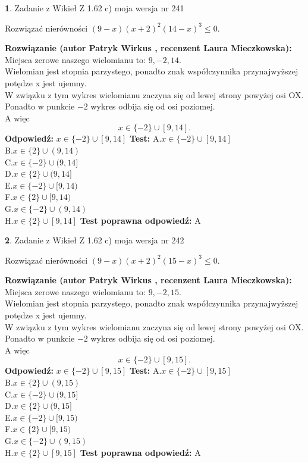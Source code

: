 \documentclass[12pt, a4paper]{article}
\theoremstyle{definition} %
\newtheorem{zad}{}
\newcommand{\zadStart}[1]{\begin{zad}#1\newline}
\newcommand{\zadStop}{\end{zad}}
\newcommand{\rozwStart}[2]{\noindent \textbf{Rozwiązanie (autor #1 , recenzent #2): }\newline}
\newcommand{\rozwStop}{\newline}
\newcommand{\odpStart}{\noindent \textbf{Odpowiedź:}\newline}
\newcommand{\odpStop}{\newline}
\newcommand{\testStart}{\noindent \textbf{Test:}\newline}
\newcommand{\testStop}{\newline}
\newcommand{\kluczStart}{\noindent \textbf{Test poprawna odpowiedź:}\newline}
\newcommand{\kluczStop}{\newline}
\begin{document}
\zadStart{Zadanie z Wikieł Z 1.62 c) moja wersja nr 241}

Rozwiązać nierówności $(9-x)(x+2)^{2}(14-x)^{3}\le0$.
\zadStop
\rozwStart{Patryk Wirkus}{Laura Mieczkowska}
Miejsca zerowe naszego wielomianu to: $9, -2, 14$.\\
Wielomian jest stopnia parzystego, ponadto znak współczynnika przy\linebreak najwyższej potędze x jest ujemny.\\ W związku z tym wykres wielomianu zaczyna się od lewej strony powyżej osi OX.\\
Ponadto w punkcie $-2$ wykres odbija się od osi poziomej.\\
A więc $$x \in \{-2\} \cup [9,14].$$
\rozwStop
\odpStart
$x \in \{-2\} \cup [9,14]$
\odpStop
\testStart
A.$x \in \{-2\} \cup [9,14]$\\
B.$x \in \{2\} \cup (9,14)$\\
C.$x \in \{-2\} \cup (9,14]$\\
D.$x \in \{2\} \cup (9,14]$\\
E.$x \in \{-2\} \cup [9,14)$\\
F.$x \in \{2\} \cup [9,14)$\\
G.$x \in \{-2\} \cup (9,14)$\\
H.$x \in \{2\} \cup [9,14]$
\testStop
\kluczStart
A
\kluczStop



\zadStart{Zadanie z Wikieł Z 1.62 c) moja wersja nr 242}

Rozwiązać nierówności $(9-x)(x+2)^{2}(15-x)^{3}\le0$.
\zadStop
\rozwStart{Patryk Wirkus}{Laura Mieczkowska}
Miejsca zerowe naszego wielomianu to: $9, -2, 15$.\\
Wielomian jest stopnia parzystego, ponadto znak współczynnika przy\linebreak najwyższej potędze x jest ujemny.\\ W związku z tym wykres wielomianu zaczyna się od lewej strony powyżej osi OX.\\
Ponadto w punkcie $-2$ wykres odbija się od osi poziomej.\\
A więc $$x \in \{-2\} \cup [9,15].$$
\rozwStop
\odpStart
$x \in \{-2\} \cup [9,15]$
\odpStop
\testStart
A.$x \in \{-2\} \cup [9,15]$\\
B.$x \in \{2\} \cup (9,15)$\\
C.$x \in \{-2\} \cup (9,15]$\\
D.$x \in \{2\} \cup (9,15]$\\
E.$x \in \{-2\} \cup [9,15)$\\
F.$x \in \{2\} \cup [9,15)$\\
G.$x \in \{-2\} \cup (9,15)$\\
H.$x \in \{2\} \cup [9,15]$
\testStop
\kluczStart
A
\kluczStop
\end{document}
